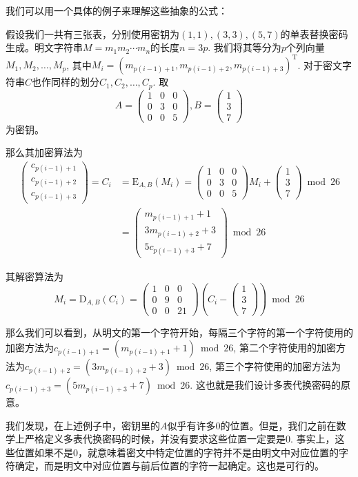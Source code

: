\documentclass[UTF8]{ctexrep}
\def\pth#1{\left( {#1}\right)}
\def\E#1#2{{\mathrm{E}_{#1}\left({#2}\right)}}
\def\D#1#2{{\mathrm{D}_{#1}\left({#2}\right)}}
\begin{document}
我们可以用一个具体的例子来理解这些抽象的公式：\par
假设我们一共有三张表，分别使用密钥为$\pth{1, 1}, \pth{3, 3}, \pth{5, 7}$的单表替换密码生成。明文字符串$M=m_1m_2\cdots m_n$的长度$n=3p$. 我们将其等分为$p$个列向量$M_1, M_2, \ldots, M_p$, 其中$M_i=\pth{m_{p(i-1)+1}, m_{p(i-1)+2}, m_{p(i-1)+3}}^{\mathrm{T}}$. 对于密文字符串$C$也作同样的划分$C_1, C_2, \ldots, C_p$. 取
\[A=\pth{\begin{array}{ccc}1&0&0\\0&3&0\\0&0&5\end{array}}, B=\pth{\begin{array}{c}1\\3\\7\end{array}}\]
为密钥。\par
那么其加密算法为
\begin{align*}
    \pth{\begin{array}{c}c_{p(i-1)+1}\\c_{p(i-1)+2}\\c_{p(i-1)+3}\end{array}}=C_i&=\E{A, B}{M_i}=\pth{\begin{array}{ccc}1&0&0\\0&3&0\\0&0&5\end{array}}M_i+\pth{\begin{array}{c}1\\3\\7\end{array}}\bmod{26}\\
    &=\pth{\begin{array}{c}m_{p(i-1)+1}+1\\3m_{p(i-1)+2}+3\\5c_{p(i-1)+3}+7\end{array}}\bmod{26}
\end{align*}

其解密算法为
\[M_i=\D{A, B}{C_i}=\pth{\begin{array}{ccc}1&0&0\\0&9&0\\0&0&21\end{array}}\pth{C_i-\pth{\begin{array}{c}1\\3\\7\end{array}}}\bmod{26}\]

那么我们可以看到，从明文的第一个字符开始，每隔三个字符的第一个字符使用的加密方法为$c_{p(i-1)+1}=\pth{m_{p(i-1)+1}+1}\bmod{26}$, 第二个字符使用的加密方法为$c_{p(i-1)+2}=\pth{3m_{p(i-1)+2}+3}\bmod{26}$, 第三个字符使用的加密方法为$c_{p(i-1)+3}=\pth{5m_{p(i-1)+3}+7}\bmod{26}$. 这也就是我们设计多表代换密码的原意。\par
我们发现，在上述例子中，密钥里的$A$似乎有许多$0$的位置。但是，我们之前在数学上严格定义多表代换密码的时候，并没有要求这些位置一定要是$0$. 事实上，这些位置如果不是$0$，就意味着密文中特定位置的字符并不是由明文中对应位置的字符确定，而是明文中对应位置与前后位置的字符一起确定。这也是可行的。
\end{document}

